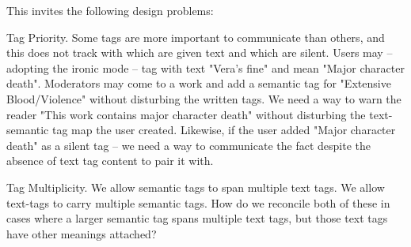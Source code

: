 \documentclass{amsart}
\theoremstyle{remark}
\begin{document}
This invites the following design problems: 
\begin{prob}Tag Priority. Some tags are more important to communicate than others, and this does not track with which are given text and which are silent. Users may -- adopting the ironic mode -- tag with text "Vera's fine" and mean "Major character death". Moderators may come to a work and add a semantic tag for "Extensive Blood/Violence" without disturbing the written tags. We need a way to warn the reader "This work contains major character death" without disturbing the text-semantic tag map the user created. Likewise, if the user added "Major character death" as a silent tag -- we need a way to communicate the fact despite the absence of text tag content to pair it with. \end{prob} 
\begin{prob}Tag Multiplicity. We allow semantic tags to span multiple text tags. We allow text-tags to carry multiple semantic tags. How do we reconcile both of these in cases where a larger semantic tag spans multiple text tags, but those text tags have other meanings attached?\end{prob}
\end{document}
